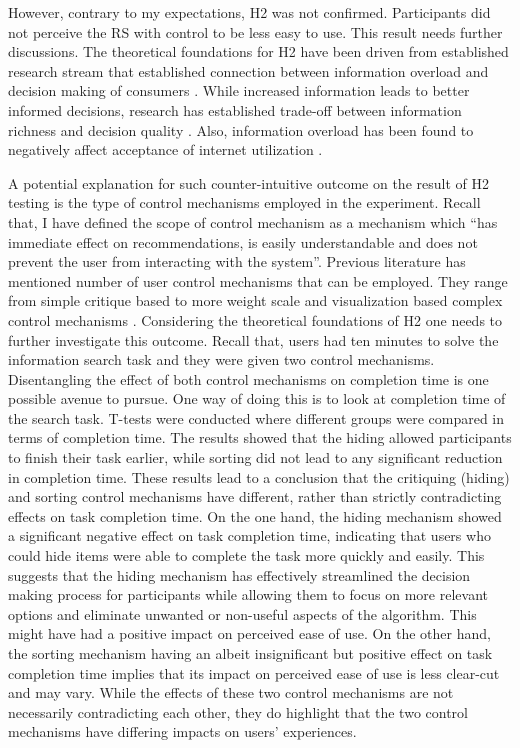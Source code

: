 \documentclass[a4paper,12pt]{article}
\begin{document}
However, contrary to my expectations, H2 was not confirmed. Participants did not perceive the RS with control to be less easy to use. This result needs further discussions. The theoretical foundations for H2 have been driven from established research stream that established connection between information overload and decision making of consumers \citep{jacoby1974brand, chenEffectsInformationOverload2009}. While increased information leads to better informed decisions, research has established trade-off between information richness and decision quality \citep{jacoby1974brand, malhotra1982information}. Also, information overload has been found to negatively affect acceptance of internet utilization \citep{shih2004extended}. 

A potential explanation for such counter-intuitive outcome on the result of H2 testing is the type of control mechanisms employed in the experiment. Recall that, I have defined the scope of control mechanism as a mechanism which ``has immediate effect on recommendations, is easily understandable and does not prevent the user from interacting with the system''. Previous literature has mentioned number of user control mechanisms that can be employed. They range from simple critique based to more weight scale and visualization based complex control mechanisms \citep{jannach2017user, jinEffectsPersonalCharacteristics2018}. Considering the theoretical foundations of H2 one needs to further investigate this outcome. Recall that, users had ten minutes to solve the information search task and they were given two control mechanisms. Disentangling the effect of both control mechanisms on completion time is one possible avenue to pursue. One way of doing this is to look at completion time of the search task. T-tests were conducted where different groups were compared in terms of completion time. The results showed that the hiding allowed participants to finish their task earlier, while sorting did not lead to any significant reduction in completion time. These results lead to a conclusion that the critiquing (hiding) and sorting control mechanisms have different, rather than strictly contradicting effects on task completion time. On the one hand, the hiding mechanism showed a significant negative effect on task completion time, indicating that users who could hide items were able to complete the task more quickly and easily. This suggests that the hiding mechanism has effectively streamlined the decision making process for participants while allowing them to focus on more relevant options and eliminate unwanted or non-useful aspects of the algorithm. This might have had a positive impact on perceived ease of use. On the other hand, the sorting mechanism having an albeit insignificant but positive effect on task completion time implies that its impact on perceived ease of use is less clear-cut and may vary. While the effects of these two control mechanisms are not necessarily contradicting each other, they do highlight that the two control mechanisms have differing impacts on users' experiences. 
\end{document}
